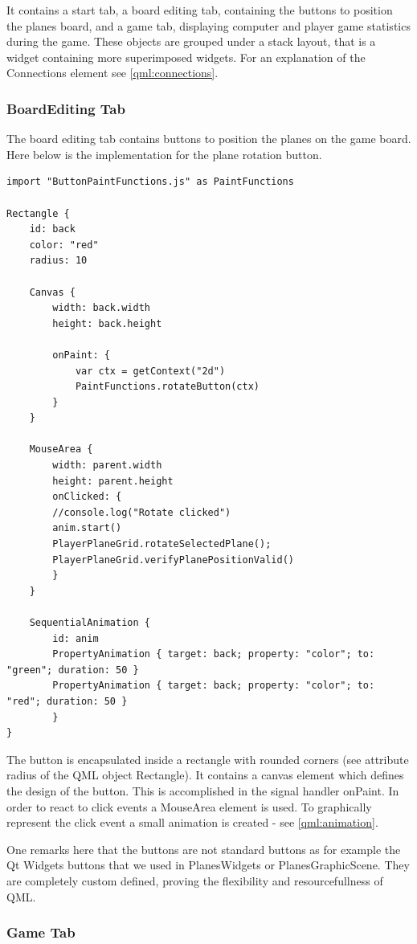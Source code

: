 It contains a start tab, a board editing tab, containing the buttons to position the planes board, and a game tab, displaying computer and player game statistics during the game. These objects are grouped under a stack layout, that is a widget containing more superimposed widgets. For an explanation of the Connections element see \ref{qml:connections}.

\subsubsection {BoardEditing Tab}

The board editing tab contains buttons to position the planes on the game board. Here below is the implementation for the plane rotation button.


\begin{lstlisting}
import "ButtonPaintFunctions.js" as PaintFunctions

Rectangle {
	id: back
	color: "red"
	radius: 10
	
	Canvas {
		width: back.width
		height: back.height
		
		onPaint: {
			var ctx = getContext("2d")
			PaintFunctions.rotateButton(ctx)
		}
	}
	
	MouseArea {
		width: parent.width
		height: parent.height
		onClicked: {
		//console.log("Rotate clicked")
		anim.start()
		PlayerPlaneGrid.rotateSelectedPlane();
		PlayerPlaneGrid.verifyPlanePositionValid()
		}
	}
	
	SequentialAnimation {
		id: anim
		PropertyAnimation { target: back; property: "color"; to: "green"; duration: 50 }
		PropertyAnimation { target: back; property: "color"; to: "red"; duration: 50 }
		}
}
\end{lstlisting}

The button is encapsulated inside a rectangle with rounded corners (see attribute radius of the QML object Rectangle). It contains a canvas element which defines the design of the button. This is accomplished in the signal handler onPaint. In order to react to click events a MouseArea element is used. To graphically represent the click event a small animation is created - see \ref{qml:animation}.

One remarks here that the buttons are not standard buttons as for example the Qt Widgets buttons that we used in PlanesWidgets or PlanesGraphicScene. They are completely custom defined, proving the flexibility and resourcefullness of QML.

\subsubsection {Game Tab}


